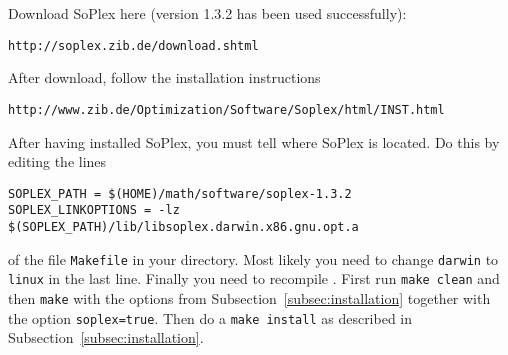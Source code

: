 Download SoPlex here (version 1.3.2 has been used successfully):
\begin{verbatim}
http://soplex.zib.de/download.shtml
\end{verbatim}
After download, follow the installation instructions
\begin{verbatim}
http://www.zib.de/Optimization/Software/Soplex/html/INST.html
\end{verbatim}
After having installed SoPlex, you must tell \name where SoPlex is located. Do this by editing the lines
\begin{footnotesize}
\begin{verbatim}
SOPLEX_PATH = $(HOME)/math/software/soplex-1.3.2
SOPLEX_LINKOPTIONS = -lz $(SOPLEX_PATH)/lib/libsoplex.darwin.x86.gnu.opt.a
\end{verbatim}
\end{footnotesize}
of the file \texttt{Makefile} in your \name directory.  Most likely
you need to change \texttt{darwin} to \texttt{linux} in the last line.
Finally you need to recompile \name. First run \texttt{make clean} and
then \texttt{make} with the options from
Subsection~\ref{subsec:installation} together with the
option \texttt{soplex=true}. Then do a \texttt{make install} as
described in Subsection~\ref{subsec:installation}.





